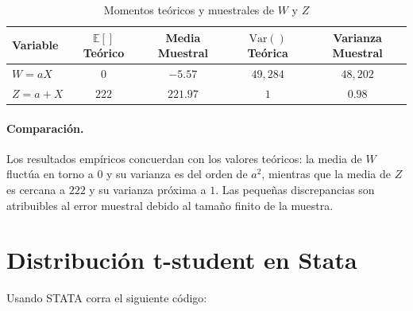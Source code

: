\documentclass[12pt]{article}
\begin{document}
\begin{itemize}
    \begin{table}[h!]
    \centering
    \caption{Momentos teóricos y muestrales de $W$ y $Z$}
    \begin{tabular}{lcccc}
    \toprule
    Variable & $\mathbb E[]$ Teórico & Media Muestral & $\mathrm{Var}()$ Teórica & Varianza Muestral \\
    \midrule
    $W = aX$ & $0$   & $-5.57$   & $49{,}284$ & $48{,}202$ \\
    $Z = a+X$ & $222$ & $221.97$  & $1$        & $0.98$ \\
    \bottomrule
    \end{tabular}
    \end{table}
    
    \paragraph{Comparación.}
    Los resultados empíricos concuerdan con los valores teóricos: la media de $W$ fluctúa en torno a $0$ y su varianza es del orden de $a^2$, mientras que la media de $Z$ es cercana a $222$ y su varianza próxima a $1$. Las pequeñas discrepancias son atribuibles al error muestral debido al tamaño finito de la muestra.
    
\end{itemize}

\section{Distribución t-student en Stata}

Usando STATA corra el siguiente código:


\end{document}
